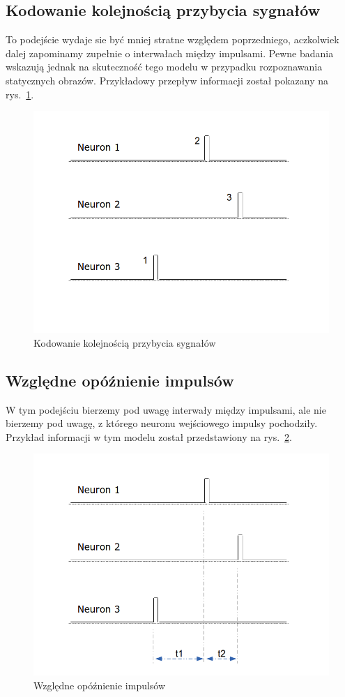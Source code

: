 \subsection{Kodowanie kolejnością przybycia sygnałów}
To podejście wydaje sie być mniej stratne względem poprzedniego, aczkolwiek dalej zapominamy zupełnie o interwałach między impulsami.
Pewne badania wskazują jednak na skuteczność tego modelu w przypadku rozpoznawania statycznych obrazów.
Przykładowy przepływ informacji został pokazany na rys.~\ref{fig:ROC}.
	\begin{figure}[ht]
		\centering
		\includegraphics[width=\textwidth/2]{../ROC.png}
		\caption{Kodowanie kolejnością przybycia sygnałów}
                \label{fig:ROC}
	\end{figure}
\subsection{Względne opóźnienie impulsów}
W tym podejściu bierzemy pod uwagę interwały między impulsami, ale nie bierzemy pod uwagę, z którego neuronu wejściowego impulsy pochodziły.
Przykład informacji w tym modelu został przedstawiony na rys.~\ref{fig:Latency}.
	\begin{figure}[ht]
		\centering
		\includegraphics[width=\textwidth/2]{../Latency.png}
		\caption{Względne opóźnienie impulsów}
                \label{fig:Latency}
	\end{figure}
